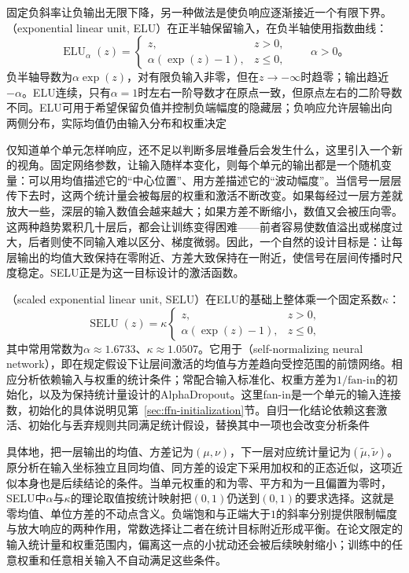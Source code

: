 固定负斜率让负输出无限下降，另一种做法是使负响应逐渐接近一个有限下界。（exponential linear unit, ELU）在正半轴保留输入，在负半轴使用指数曲线：
\begin{equation}
  \operatorname{ELU}_{\alpha}(z)=
  \begin{cases}
    z,&z>0,\\
    \alpha(\exp(z)-1),&z\leq0,
  \end{cases}
  \qquad \alpha>0\text{。}
  \label{eq:ffn-elu}
\end{equation}
负半轴导数为$\alpha\exp(z)$，对有限负输入非零，但在$z\to-\infty$时趋零；输出趋近$-\alpha$。ELU连续，只有$\alpha=1$时左右一阶导数才在原点一致，但原点左右的二阶导数不同。ELU可用于希望保留负值并控制负端幅度的隐藏层；负响应允许层输出向两侧分布，实际均值仍由输入分布和权重决定

仅知道单个单元怎样响应，还不足以判断多层堆叠后会发生什么，这里引入一个新的视角。固定网络参数，让输入随样本变化，则每个单元的输出都是一个随机变量：可以用均值描述它的“中心位置”、用方差描述它的“波动幅度”。当信号一层层传下去时，这两个统计量会被每层的权重和激活不断改变。如果每经过一层方差就放大一些，深层的输入数值会越来越大；如果方差不断缩小，数值又会被压向零。这两种趋势累积几十层后，都会让训练变得困难——前者容易使数值溢出或梯度过大，后者则使不同输入难以区分、梯度微弱。因此，一个自然的设计目标是：让每层输出的均值大致保持在零附近、方差大致保持在一附近，使信号在层间传播时尺度稳定。SELU正是为这一目标设计的激活函数。

（scaled exponential linear unit, SELU）在ELU的基础上整体乘一个固定系数$\kappa$：
\begin{equation}
  \operatorname{SELU}(z)=\kappa
  \begin{cases}
    z,&z>0,\\
    \alpha(\exp(z)-1),&z\leq0,
  \end{cases}
  \label{eq:ffn-selu}
\end{equation}
其中常用常数为$\alpha\approx1.6733$、$\kappa\approx1.0507$。它用于（self-normalizing neural network），即在规定假设下让层间激活的均值与方差趋向受控范围的前馈网络。相应分析依赖输入与权重的统计条件；常配合输入标准化、权重方差为$1/\mathrm{fan\text{-}in}$的初始化，以及为保持统计量设计的AlphaDropout。这里fan-in是一个单元的输入连接数，初始化的具体说明见第~\ref{sec:ffn-initialization}节。自归一化结论依赖这套激活、初始化与丢弃规则共同满足统计假设，替换其中一项也会改变分析条件

具体地，把一层输出的均值、方差记为$(\mu,\nu)$，下一层对应统计量记为$(\widetilde\mu,\widetilde\nu)$。原分析在输入坐标独立且同均值、同方差的设定下采用加权和的正态近似，这项近似本身也是后续结论的条件。当单元权重的和为零、平方和为一且偏置为零时，SELU中$\alpha$与$\kappa$的理论取值按统计映射把$(0,1)$仍送到$(0,1)$的要求选择。这就是零均值、单位方差的不动点含义。负端饱和与正端大于$1$的斜率分别提供限制幅度与放大响应的两种作用，常数选择让二者在统计目标附近形成平衡。在论文限定的输入统计量和权重范围内，偏离这一点的小扰动还会被后续映射缩小；训练中的任意权重和任意相关输入不自动满足这些条件。

